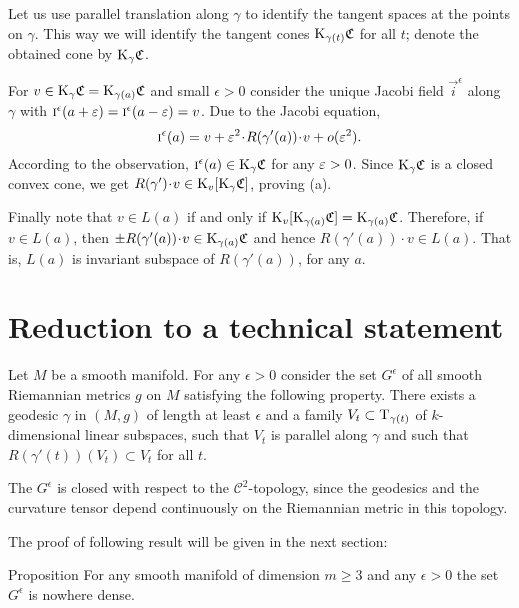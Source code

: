 \documentclass[a4paper,10pt]{article}
\begin{document}
Let us use parallel translation along $\gamma$ to identify the tangent spaces at the points on $\gamma$.
This way we will identify the tangent cones $\mathrm{K}_{\gamma(t)}\mathfrak{C}$ for all $t$;
denote the obtained cone by $\mathrm{K}_\gamma\mathfrak{C}$.

For $v\in \mathrm{K}_\gamma\mathfrak{C}  = \mathrm{K}_{\gamma  (a)}\mathfrak{C}$ and small $\epsilon >0$ consider the unique Jacobi field   $\vec{i} ^{\epsilon}$ along $\gamma$ with
 $\vec{i}^{\epsilon} (a+\eps)\z=\vec{i} ^{\epsilon}(a-\eps)=v$.
Due to the  Jacobi equation,
\[\vec{i}^{\epsilon} (a)=v +\eps^2\cdot R(\gamma'(a))\cdot v +o(\eps^2).\]
According to the observation, $\text{\sc{i}} ^{\epsilon}(a)\in \mathrm{K}_{\gamma} \mathfrak{C}$ for any $\varepsilon>0$.
Since $\mathrm{K}_{\gamma} \mathfrak{C}$ is a closed convex cone, we get $R(\gamma')\cdot v\z\in \K_v[\K_\gamma\mathfrak{C}]$, proving (a).

Finally note that $v\in L(a)$ if and only if $\mathrm{K}_v[\mathrm{K}_{\gamma(a)}\mathfrak{C}]=\mathrm{K}_{\gamma(a)}\mathfrak{C}$.
Therefore, if $v\in L(a)$, then $\pm R(\gamma'(a))\cdot v\in \K_{\gamma(a)}\mathfrak{C}$ and hence $R(\gamma'(a))\cdot v\in L(a)$.
That is, $L(a)$ is invariant subspace of $ R(\gamma'(a))$, for any $a$.
\qeds
  
  
  
  \section{Reduction to a technical statement}
 Let $M$ be a smooth manifold.  For any $\epsilon >0$ consider the set $G^{\epsilon}$ of all smooth Riemannian metrics  $g$ on $M$ satisfying the following property. There exists 
 a geodesic
 $\gamma$ in $(M,g)$ of length at least $\epsilon$   and a family $V_t \subset \mathrm{T}_{\gamma (t)}$ of  $k$-dimensional linear subspaces, such that $V_t$ is parallel along $\gamma$ and such that
 $R(\gamma'(t))  (V_t)\subset V_t$  for all $t$.
 
The  $G^{\epsilon}$ is closed with respect to the $\mathcal C^2$-topology, since the  geodesics and the curvature tensor depend continuously on the Riemannian metric in this topology.
    
  The proof of following result will be  given in the next section:
  \begin{thm}  {Proposition}\label{technic}
  	For any smooth manifold of dimension $m\geq 3$ and any $\epsilon >0$ the set $G^{\epsilon}$ is nowhere dense.
  	\end{thm}
  
\end{document}
